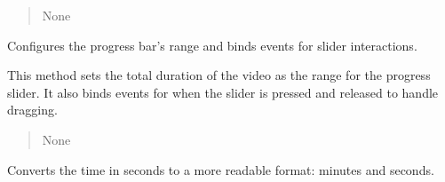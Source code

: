 \documentclass[letterpaper,10pt,english]{sphinxmanual}
\begin{document}
\begin{fulllineitems}
\begin{fulllineitems}
\begin{quote}
\begin{description}
\sphinxAtStartPar
None

\sphinxAtStartPar
{} \textendash{} 

\end{description}\end{quote}

\end{fulllineitems}


\begin{fulllineitems}
\label{\detokenize{general_interface:general_interface.LecteurVideo.configurer_barre_progression}}
\pysigstartsignatures
{}
\pysigstopsignatures
\sphinxAtStartPar
Configures the progress bar’s range and binds events for slider interactions.

\sphinxAtStartPar
This method sets the total duration of the video as the range for the progress slider.
It also binds events for when the slider is pressed and released to handle dragging.
\begin{quote}\begin{description}
\sphinxAtStartPar
{} \textendash{} 

\sphinxAtStartPar
None

\sphinxAtStartPar
{} \textendash{} 

\end{description}\end{quote}

\end{fulllineitems}


\begin{fulllineitems}
\label{\detokenize{general_interface:general_interface.LecteurVideo.format_duree}}
\pysigstartsignatures
{}
\pysigstopsignatures
\sphinxAtStartPar
Converts the time in seconds to a more readable format: minutes and seconds.


\end{fulllineitems}
\end{fulllineitems}
\end{document}
